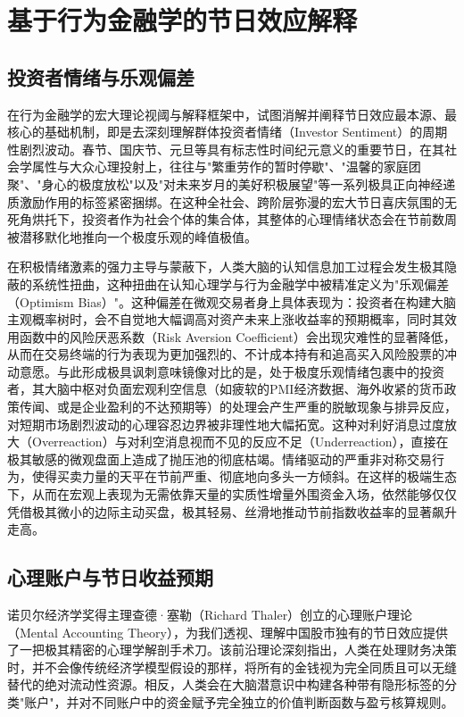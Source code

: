 \documentclass{cupb-thesis}
\begin{document}
{\chapter*{基于行为金融学的节日效应解释}


\section{投资者情绪与乐观偏差}


在行为金融学的宏大理论视阈与解释框架中，试图消解并阐释节日效应最本源、最核心的基础机制，即是去深刻理解群体投资者情绪（Investor Sentiment）的周期性剧烈波动。春节、国庆节、元旦等具有标志性时间纪元意义的重要节日，在其社会学属性与大众心理投射上，往往与"繁重劳作的暂时停歇"、"温馨的家庭团聚"、"身心的极度放松"以及"对未来岁月的美好积极展望"等一系列极具正向神经递质激励作用的标签紧密捆绑。在这种全社会、跨阶层弥漫的宏大节日喜庆氛围的无死角烘托下，投资者作为社会个体的集合体，其整体的心理情绪状态会在节前数周被潜移默化地推向一个极度乐观的峰值极值。


在积极情绪激素的强力主导与蒙蔽下，人类大脑的认知信息加工过程会发生极其隐蔽的系统性扭曲，这种扭曲在认知心理学与行为金融学中被精准定义为"乐观偏差（Optimism Bias）"。这种偏差在微观交易者身上具体表现为：投资者在构建大脑主观概率树时，会不自觉地大幅调高对资产未来上涨收益率的预期概率，同时其效用函数中的风险厌恶系数（Risk Aversion Coefficient）会出现灾难性的显著降低，从而在交易终端的行为表现为更加强烈的、不计成本持有和追高买入风险股票的冲动意愿。与此形成极具讽刺意味镜像对比的是，处于极度乐观情绪包裹中的投资者，其大脑中枢对负面宏观利空信息（如疲软的PMI经济数据、海外收紧的货币政策传闻、或是企业盈利的不达预期等）的处理会产生严重的脱敏现象与排异反应，对短期市场剧烈波动的心理容忍边界被非理性地大幅拓宽。这种对利好消息过度放大（Overreaction）与对利空消息视而不见的反应不足（Underreaction），直接在极其敏感的微观盘面上造成了抛压池的彻底枯竭。情绪驱动的严重非对称交易行为，使得买卖力量的天平在节前严重、彻底地向多头一方倾斜。在这样的极端生态下，从而在宏观上表现为无需依靠天量的实质性增量外围资金入场，依然能够仅仅凭借极其微小的边际主动买盘，极其轻易、丝滑地推动节前指数收益率的显著飙升走高。


\section{心理账户与节日收益预期}


诺贝尔经济学奖得主理查德·塞勒（Richard Thaler）创立的心理账户理论（Mental Accounting Theory），为我们透视、理解中国股市独有的节日效应提供了一把极其精密的心理学解剖手术刀。该前沿理论深刻指出，人类在处理财务决策时，并不会像传统经济学模型假设的那样，将所有的金钱视为完全同质且可以无缝替代的绝对流动性资源。相反，人类会在大脑潜意识中构建各种带有隐形标签的分类"账户"，并对不同账户中的资金赋予完全独立的价值判断函数与盈亏核算规则。


}
\end{document}
